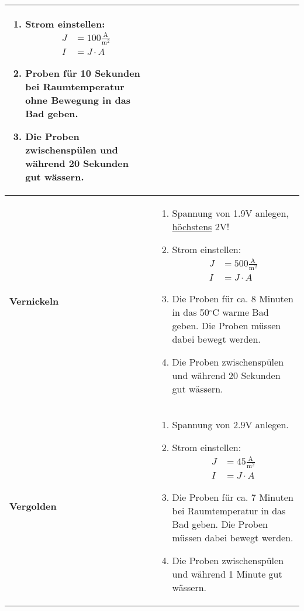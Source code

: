 \begin{longtable}{p{3cm}p{14cm}}
\begin{enumerate}
			\item Strom einstellen: 	$$\begin{aligned}
											J &= 100 \frac{\mathrm{A}}{\mathrm{m}^2}\\
											I &= J\cdot A
										\end{aligned}$$
			
			\item Proben für 10 Sekunden bei Raumtemperatur ohne Bewegung in das Bad geben.
			
			\item Die Proben zwischenspülen und während 20 Sekunden gut wässern.
		\end{enumerate}\\
	\hline
	\textbf{Vernickeln}
		&
		\begin{enumerate}
			\item Spannung von 1.9V anlegen, \underline{höchstens} 2V!
			
			\item Strom einstellen: 	$$\begin{aligned}
											J &= 500 \frac{\mathrm{A}}{\mathrm{m}^2}\\
											I &= J\cdot A
										\end{aligned}$$
										
			\item Die Proben für ca. 8 Minuten in das 50$^\circ$C warme Bad geben. Die Proben müssen dabei bewegt werden.
			
			\item Die Proben zwischenspülen und während 20 Sekunden gut wässern.
		\end{enumerate}\\
		\hline
		\textbf{Vergolden}
			&
			\begin{enumerate}
				\item Spannung von 2.9V anlegen.
				
				\item Strom einstellen: 	$$\begin{aligned}
												J &= 45 \frac{\mathrm{A}}{\mathrm{m}^2}\\
												I &= J\cdot A
											\end{aligned}$$
											
				\item Die Proben für ca. 7 Minuten bei Raumtemperatur in das Bad geben. Die Proben müssen dabei bewegt werden.
				
				\item Die Proben zwischenspülen und während 1 Minute gut wässern.
				

\end{enumerate}
\end{longtable}
